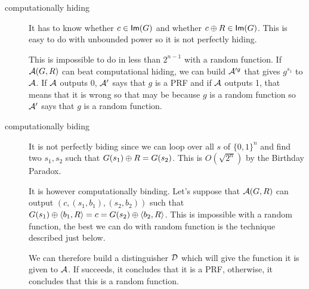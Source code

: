 \section{}
\subsection{}
\begin{solution}
  \begin{description}
    \item[computationally hiding]
      It has to know whether $c \in \operatorname{\mathsf{Im}}(G)$ and whether $c \oplus R \in \operatorname{\mathsf{Im}}(G)$.
      This is easy to do with unbounded power so it is not perfectly hiding.

      This is impossible to do in less than $2^{n-1}$ with a random function.
      If $\mathcal{A}(G,R)$ can beat computational hiding, we can build $\mathcal{A}'^g$ that gives $g^{s_1}$ to $\mathcal{A}$.
      If $\mathcal{A}$ outputs 0, $\mathcal{A}'$ says that $g$ is a PRF and if $\mathcal{A}$ outputs 1,
      that means that it is wrong so that may be because $g$ is a random function
      so $\mathcal{A}'$ says that $g$ is a random function.
    \item[computationally biding]
      It is not perfectly biding since we can loop over all $s$ of $\{0,1\}^n$ and find two $s_1,s_2$ such
      that $G(s_1) \oplus R = G(s_2)$.
      This is $O(\sqrt{2^n})$ by the Birthday Paradox.

      It is however computationally binding.
      Let's suppose that $\mathcal{A}(G,R)$ can output $(c, (s_1,b_1), (s_2, b_2))$ such that
      $G(s_1) \oplus \langle b_1,R \rangle = c = G(s_2) \oplus \langle b_2,R \rangle$.
      This is impossible with a random function, the best we can do with random function is the technique described just below.

      We can therefore build a distinguisher $\mathcal{D}$ which will give the function it is given to $\mathcal{A}$.
      If succeeds, it concludes that it is a PRF, otherwise, it concludes that this is a random function.
  \end{description}
\end{solution}

